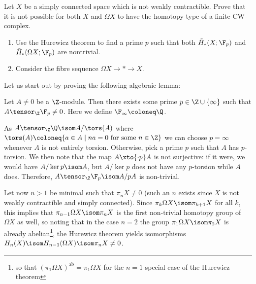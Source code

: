 \begin{exercise}
	Let $X$ be a simply connected space which is not weakly contractible.
	Prove that it is not possible for both $X$ and $\Omega X$ to have the homotopy type of a finite CW-complex.
	\begin{hint}
		\leavevmode
		\begin{enumerate}
			\item Use the Hurewicz theorem to find a prime $p$ such that both $\tilde{H}_*(X; \F_p)$ and $\tilde{H}_*(\Omega X; \F_p)$ are nontrivial.
			\item Consider the fibre sequence $\Omega X \to * \to X$.
		\end{enumerate}
	\end{hint}
\end{exercise}
\begin{solution}
	Let us start out by proving the following algebraic lemma:
	\begin{lemma}
		Let $A \neq 0$ be a $\Z$-module.
		Then there exists some prime $p \in \Z \cup \{\infty\}$ such that $A \tensor_{\Z} \F_p \neq 0$.
		Here we define $\F_\infty \coloneq \Q$.
	\end{lemma}
	\begin{smallproof}
		As $A \tensor_{\Z} \Q \isom A / \tors(A)$ where $\tors(A) \coloneq \{a \in A \mid na = 0 \text{ for some } n \in \Z\}$ we can choose $p = \infty$ whenever $A$ is not entirely torsion.
		Otherwise, pick a prime $p$ such that $A$ has $p$-torsion.
		We then note that the map $A \xto{\cdot p} A$ is not surjective: if it were, we would have $A / \ker p \isom A$, but $A / \ker p$ does not have any $p$-torsion while $A$ does.
		Therefore, $A \tensor_{\Z} \F_p \isom A / p A$ is non-trivial.
	\end{smallproof}
	Let now $n > 1$ be minimal such that $\pi_n X \neq 0$ (such an $n$ exists since $X$ is not weakly contractible and simply connected).
	Since $\pi_k \Omega X \isom \pi_{k + 1} X$ for all $k$, this implies that $\pi_{n - 1} \Omega X \isom \pi_n X$ is the first non-trivial homotopy group of $\Omega X$ as well, so noting that in the case $n = 2$ the group $\pi_1 \Omega X \isom \pi_2 X$ is already abelian\footnote{so that $(\pi_1 \Omega X)^\text{ab} = \pi_1 \Omega X$ for the $n = 1$ special case of the Hurewicz theorem}, the Hurewicz theorem yields isomorphisms $H_n(X) \isom H_{n - 1}(\Omega X) \isom \pi_n X \neq 0$.


\end{solution}
